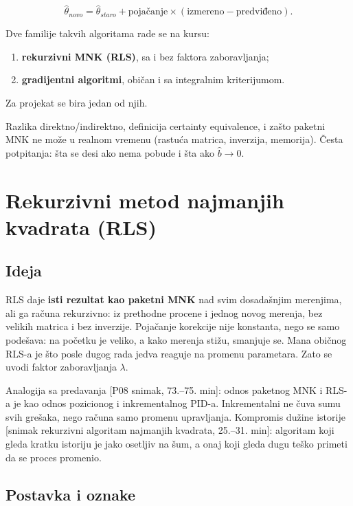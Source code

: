 \documentclass[11pt,a4paper,parskip=half,headsepline,numbers=noenddot]{scrartcl}
\DeclareRobustCommand{\izvor}[1]{{\small\color{izvorC}[#1]}}
\begin{document}
\[\hat\theta_{novo} = \hat\theta_{staro} + \text{pojačanje}\times(\text{izmereno} - \text{predviđeno}) .\]

Dve familije takvih algoritama rade se na kursu:

\begin{enumerate}
\def\labelenumi{\arabic{enumi}.}
\item \textbf{rekurzivni MNK (RLS)}, sa i bez faktora zaboravljanja;
\item \textbf{gradijentni algoritmi}, običan i sa integralnim kriterijumom.
\end{enumerate}

Za projekat se bira jedan od njih.

\begin{ispit}
Razlika direktno/indirektno, definicija certainty equivalence, i zašto paketni MNK ne može u realnom vremenu (rastuća matrica, inverzija, memorija). Česta potpitanja: šta se desi ako nema pobude i šta ako \(\hat b \to 0\).
\end{ispit}

\section{Rekurzivni metod najmanjih kvadrata (RLS)}

\subsection{Ideja}

RLS daje \textbf{isti rezultat kao paketni MNK} nad svim dosadašnjim merenjima, ali ga računa rekurzivno: iz prethodne procene i jednog novog merenja, bez velikih matrica i bez inverzije. Pojačanje korekcije nije konstanta, nego se samo podešava: na početku je veliko, a kako merenja stižu, smanjuje se. Mana običnog RLS-a je što posle dugog rada jedva reaguje na promenu parametara. Zato se uvodi faktor zaboravljanja \(\lambda\).

Analogija sa predavanja \izvor{P08 snimak, 73.--75. min}: odnos paketnog MNK i RLS-a je kao odnos pozicionog i inkrementalnog PID-a. Inkrementalni ne čuva sumu svih grešaka, nego računa samo promenu upravljanja. Kompromis dužine istorije \izvor{snimak rekurzivni algoritam najmanjih kvadrata, 25.--31. min}: algoritam koji gleda kratku istoriju je jako osetljiv na šum, a onaj koji gleda dugu teško primeti da se proces promenio.

\subsection{Postavka i oznake}
\end{document}
